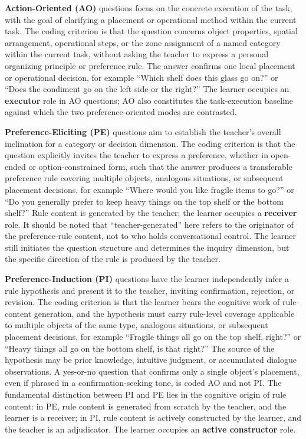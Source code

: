 \documentclass[manuscript,review,anonymous]{acmart}
\begin{document}
\textbf{Action-Oriented (AO)} questions focus on the concrete execution of the task, with the goal of clarifying a placement or operational method within the current task. The coding criterion is that the question concerns object properties, spatial arrangement, operational steps, or the zone assignment of a named category within the current task, without asking the teacher to express a personal organizing principle or preference rule. The answer confirms one local placement or operational decision, for example ``Which shelf does this glass go on?'' or ``Does the condiment go on the left side or the right?'' The learner occupies an \textbf{executor} role in AO questions; AO also constitutes the task-execution baseline against which the two preference-oriented modes are contrasted.

\textbf{Preference-Eliciting (PE)} questions aim to establish the teacher's overall inclination for a category or decision dimension. The coding criterion is that the question explicitly invites the teacher to express a preference, whether in open-ended or option-constrained form, such that the answer produces a transferable preference rule covering multiple objects, analogous situations, or subsequent placement decisions, for example ``Where would you like fragile items to go?'' or ``Do you generally prefer to keep heavy things on the top shelf or the bottom shelf?'' Rule content is generated by the teacher; the learner occupies a \textbf{receiver} role. It should be noted that ``teacher-generated'' here refers to the originator of the preference-rule content, not to who holds conversational control. The learner still initiates the question structure and determines the inquiry dimension, but the specific direction of the rule is produced by the teacher.

\textbf{Preference-Induction (PI)} questions have the learner independently infer a rule hypothesis and present it to the teacher, inviting confirmation, rejection, or revision. The coding criterion is that the learner bears the cognitive work of rule-content generation, and the hypothesis must carry rule-level coverage applicable to multiple objects of the same type, analogous situations, or subsequent placement decisions, for example ``Fragile things all go on the top shelf, right?'' or ``Heavy things all go on the bottom shelf, is that right?'' The source of the hypothesis may be prior knowledge, intuitive judgment, or accumulated dialogue observations. A yes-or-no question that confirms only a single object's placement, even if phrased in a confirmation-seeking tone, is coded AO and not PI. The fundamental distinction between PI and PE lies in the cognitive origin of rule content: in PE, rule content is generated from scratch by the teacher, and the learner is a receiver; in PI, rule content is actively constructed by the learner, and the teacher is an adjudicator. The learner occupies an \textbf{active constructor} role.
\end{document}
